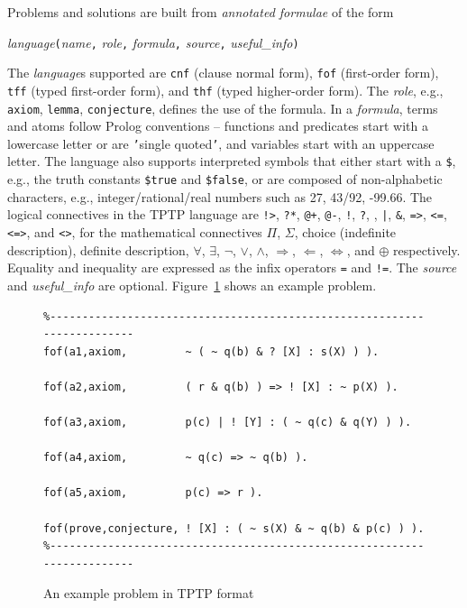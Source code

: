 \documentclass[runningheads]{llncs}
\newcommand{\smalltt}[1]{\small \texttt{#1}}
\begin{document}
Problems and solutions are built from {\em annotated formulae} of the form
\begin{center}
{\em language}{\tt (}{\em name}{\tt ,}
{\em role}{\tt ,}
{\em formula}{\tt ,}
{\em source}{\tt ,}
{\em useful\_info}{\tt )}
\end{center}
The {\em language}s supported are {\smalltt{cnf}} (clause normal form), {\smalltt{fof}}
(first-order form), {\smalltt{tff}} (typed first-order form), and {\smalltt{thf}}
(typed higher-order form).
The {\em role}, e.g., {\smalltt{axiom}}, {\smalltt{lemma}}, {\smalltt{conjecture}}, defines the 
use of the formula.
In a {\em formula}, terms and atoms follow Prolog conventions -- functions and predicates start 
with a lowercase letter or are {\tt '}single quoted{\tt '}, and variables start with an uppercase 
letter.
The language also supports interpreted symbols that either start with a {\tt \$}, e.g., the 
truth constants {\smalltt{\$true}} and {\smalltt{\$false}}, or are composed of 
non-alphabetic characters, e.g., integer/rational/real numbers such as 27, 43/92, -99.66.
The logical connectives in the TPTP language are
{\tt !>}, {\tt ?*}, {\tt @+}, {\tt @-}, {\tt !}, {\tt ?}, {\tt {\raisebox{0.4ex}{\texttildelow}}}, 
{\tt |}, {\tt \&}, {\tt =>}, {\tt <=}, {\tt <=>}, and {\tt <{\raisebox{0.4ex}{\texttildelow}}>},
for the mathematical connectives
$\Pi$, $\Sigma$, choice (indefinite description), definite description,
$\forall$, $\exists$, $\neg$, $\vee$, $\wedge$, $\Rightarrow$, $\Leftarrow$, $\Leftrightarrow$, 
and $\oplus$ respectively.
Equality and inequality are expressed as the infix operators {\tt =} and {\tt !=}.
The {\em source} and {\em useful\_info} are optional.
Figure~\ref{ExampleProblem} shows an example problem.

\begin{figure}[htb]
\centering
{\footnotesize
{\setlength{\baselineskip}{3mm}
\begin{verbatim}
%------------------------------------------------------------------------
fof(a1,axiom,         ~ ( ~ q(b) & ? [X] : s(X) ) ).

fof(a2,axiom,         ( r & q(b) ) => ! [X] : ~ p(X) ).

fof(a3,axiom,         p(c) | ! [Y] : ( ~ q(c) & q(Y) ) ).

fof(a4,axiom,         ~ q(c) => ~ q(b) ).

fof(a5,axiom,         p(c) => r ).

fof(prove,conjecture, ! [X] : ( ~ s(X) & ~ q(b) & p(c) ) ).
%------------------------------------------------------------------------
\end{verbatim}
}}
\caption{An example problem in TPTP format}
\label{ExampleProblem}
\end{figure}
\end{document}
